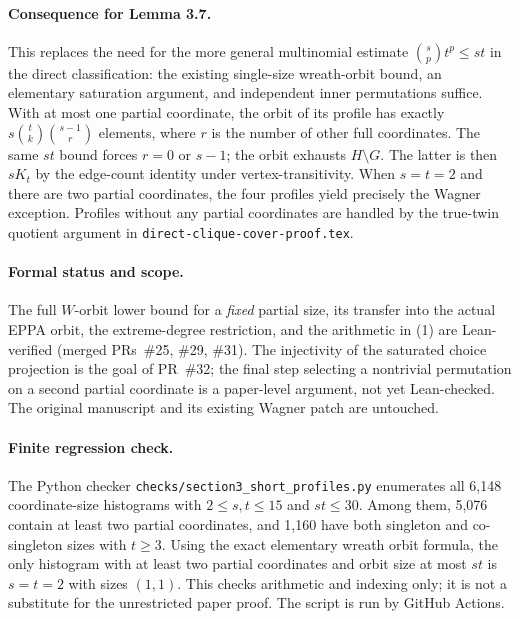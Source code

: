 \documentclass[11pt,a4paper]{article}
\begin{document}
\paragraph{Consequence for Lemma 3.7.}
This replaces the need for the more general
multinomial estimate
\(\binom{s}{p}t^p\le st\) in the
direct classification: the existing single-size
wreath-orbit bound, an elementary saturation
argument, and independent inner permutations suffice.
With at most one partial coordinate, the orbit
of its profile has exactly
\(s\binom tk\binom{s-1}{r}\) elements, where \(r\)
is the number of other full coordinates.
The same \(st\) bound forces \(r=0\) or \(s-1\);
the orbit exhausts \(H\setminus G\).
The latter is then \(sK_t\) by the edge-count
identity under vertex-transitivity.
When \(s=t=2\) and there are two partial
coordinates, the four profiles yield precisely
the Wagner exception. Profiles without any partial
coordinates are handled by the true-twin quotient
argument in \texttt{direct-clique-cover-proof.tex}.

\paragraph{Formal status and scope.}
The full \(W\)-orbit lower bound for a \emph{fixed}
partial size, its transfer into the actual EPPA orbit,
the extreme-degree restriction, and the arithmetic
in (1) are Lean-verified (merged PRs~\#25, \#29, \#31).
The injectivity of the saturated choice projection is
the goal of PR~\#32; the final step selecting a
nontrivial permutation on a second partial coordinate
is a paper-level argument, not yet Lean-checked.
The original manuscript and its existing Wagner
patch are untouched.

\paragraph{Finite regression check.}
The Python checker
\texttt{checks/section3\_short\_profiles.py} enumerates all
6,148 coordinate-size histograms with \(2\le s,t\le15\)
and \(st\le30\). Among them, 5,076 contain at least
two partial coordinates, and 1,160 have both singleton
and co-singleton sizes with \(t\ge3\).
Using the exact elementary wreath orbit formula, the
only histogram with at least two partial coordinates
and orbit size at most \(st\) is \(s=t=2\)
with sizes \((1,1)\).
This checks arithmetic and indexing only; it is
not a substitute for the unrestricted paper proof.
The script is run by GitHub Actions.
\end{document}
